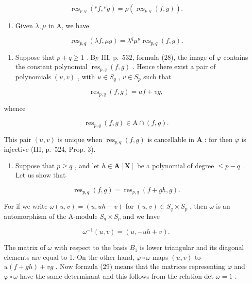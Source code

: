 \[
\operatorname{res} _ {p, q} \left({}^ {\rho} f, {}^ {\rho} g\right) = \rho \left(\operatorname{res} _ {p, q} (f, g)\right).
\]

\begin{enumerate}
\def\labelenumi{\arabic{enumi})}
\setcounter{enumi}{2}
\tightlist
\item
  Given \(\lambda, \mu\) in A, we have
\end{enumerate}

\[
\operatorname{res} _ {p, q} (\lambda f, \mu g) = \lambda^ {q} \mu^ {p} \operatorname{res} _ {p, q} (f, g).\tag{28}
\]

\begin{enumerate}
\def\labelenumi{\arabic{enumi})}
\setcounter{enumi}{3}
\tightlist
\item
  Suppose that \(p + q \geqslant 1\) . By III, p.~532, formula (28), the image of \(\varphi\) contains the constant polynomial \(\operatorname{res}_{p,q}(f, g)\) . Hence there exist a pair of polynomials \((u, v)\) , with \(u \in S_q\) , \(v \in S_p\) such that
\end{enumerate}

\[
\operatorname{res} _ {p, q} (f, g) = u f + v g,
\]

whence

\[
\operatorname{res} _ {p, q} (f, g) \in \mathrm{A} \cap (f, g).
\]

This pair \((u, v)\) is unique when \(\operatorname{res}_{p,q}(f, g)\) is cancellable in \(\mathbf{A}\) : for then \(\varphi\) is injective (III, p.~524, Prop. 3).

\begin{enumerate}
\def\labelenumi{\arabic{enumi})}
\setcounter{enumi}{4}
\tightlist
\item
  Suppose that \(p \geqslant q\) , and let \(h \in \mathbf{A}[\mathbf{X}]\) be a polynomial of degree \(\leqslant p - q\) . Let us show that
\end{enumerate}

\[
\operatorname{res} _ {p, q} (f, g) = \operatorname{res} _ {p, q} (f + g h, g).\tag{29}
\]

For if we write \(\omega(u, v) = (u, uh + v)\) for \((u, v) \in S_q \times S_p\) , then \(\omega\) is an automorphism of the A-module \(S_q \times S_p\) and we have

\[
\omega^ {- 1} (u, v) = (u, - u h + v).
\]

The matrix of \(\omega\) with respect to the basis \(B_{1}\) is lower triangular and its diagonal elements are equal to 1. On the other hand, \(\varphi \circ \omega\) maps \((u, v)\) to \(u(f + gh) + vg\) . Now formula (29) means that the matrices representing \(\varphi\) and \(\varphi \circ \omega\) have the same determinant and this follows from the relation det \(\omega = 1\) .

